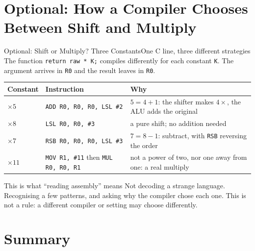 \documentclass[9pt,aspectratio=169,xcolor=table]{beamer}
\begin{document}
\section{Optional: How a Compiler Chooses Between Shift and Multiply}

\begin{frame}{Optional: Shift or Multiply? Three Constants}{One C line, three different strategies}
    \leavevmode
    {\small The function \texttt{return raw * K;} compiles differently for each constant \texttt{K}. The argument arrives in \texttt{R0} and the result leaves in \texttt{R0}.}

    \vspace{2mm}
    \begin{center}
    {\small
    \striped
    \begin{tabular}{@{}l l R{.34\textwidth}@{}}
        \toprule
        \textbf{Constant} & \textbf{Instruction} & \textbf{Why} \\
        \midrule
        $\times 5$  & \texttt{ADD R0, R0, R0, LSL \#2} & $5 = 4 + 1$: the shifter makes $4\times$, the ALU adds the original \\
        $\times 8$  & \texttt{LSL R0, R0, \#3}         & a pure shift; no addition needed \\
        $\times 7$  & \texttt{RSB R0, R0, R0, LSL \#3} & $7 = 8 - 1$: subtract, with \texttt{RSB} reversing the order \\
        $\times 11$ & \texttt{MOV R1, \#11} then \texttt{MUL R0, R0, R1} & not a power of two, nor one away from one: a real multiply \\
        \bottomrule
    \end{tabular}}
    \end{center}

    \vspace{2mm}
    \begin{block}{This is what ``reading assembly'' means}
        Not decoding a strange language. Recognising a few patterns, and asking \alert{why the compiler chose each one}. This is not a rule: a different compiler or setting may choose differently.
    \end{block}
\end{frame}


\section{Summary}
\end{document}
